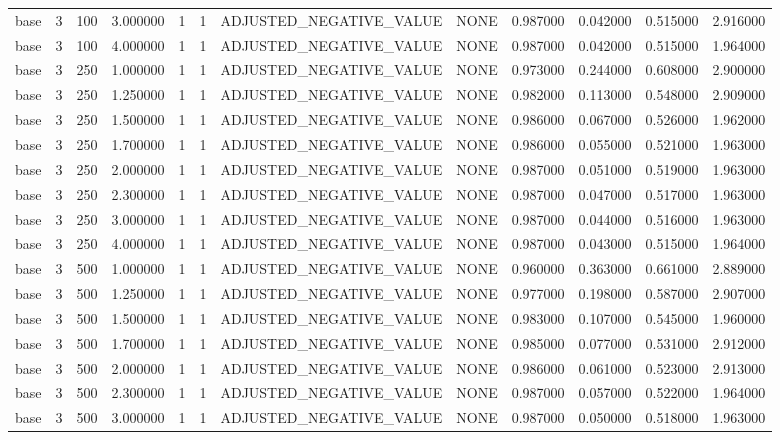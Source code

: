 \begin{tabular}{lrrrllllrrrr}
base & 3 & 100 & 3.000000 & 1 & 1 & ADJUSTED_NEGATIVE_VALUE & NONE & 0.987000 & 0.042000 & 0.515000 & 2.916000 \\
base & 3 & 100 & 4.000000 & 1 & 1 & ADJUSTED_NEGATIVE_VALUE & NONE & 0.987000 & 0.042000 & 0.515000 & 1.964000 \\
base & 3 & 250 & 1.000000 & 1 & 1 & ADJUSTED_NEGATIVE_VALUE & NONE & 0.973000 & 0.244000 & 0.608000 & 2.900000 \\
base & 3 & 250 & 1.250000 & 1 & 1 & ADJUSTED_NEGATIVE_VALUE & NONE & 0.982000 & 0.113000 & 0.548000 & 2.909000 \\
base & 3 & 250 & 1.500000 & 1 & 1 & ADJUSTED_NEGATIVE_VALUE & NONE & 0.986000 & 0.067000 & 0.526000 & 1.962000 \\
base & 3 & 250 & 1.700000 & 1 & 1 & ADJUSTED_NEGATIVE_VALUE & NONE & 0.986000 & 0.055000 & 0.521000 & 1.963000 \\
base & 3 & 250 & 2.000000 & 1 & 1 & ADJUSTED_NEGATIVE_VALUE & NONE & 0.987000 & 0.051000 & 0.519000 & 1.963000 \\
base & 3 & 250 & 2.300000 & 1 & 1 & ADJUSTED_NEGATIVE_VALUE & NONE & 0.987000 & 0.047000 & 0.517000 & 1.963000 \\
base & 3 & 250 & 3.000000 & 1 & 1 & ADJUSTED_NEGATIVE_VALUE & NONE & 0.987000 & 0.044000 & 0.516000 & 1.963000 \\
base & 3 & 250 & 4.000000 & 1 & 1 & ADJUSTED_NEGATIVE_VALUE & NONE & 0.987000 & 0.043000 & 0.515000 & 1.964000 \\
base & 3 & 500 & 1.000000 & 1 & 1 & ADJUSTED_NEGATIVE_VALUE & NONE & 0.960000 & 0.363000 & 0.661000 & 2.889000 \\
base & 3 & 500 & 1.250000 & 1 & 1 & ADJUSTED_NEGATIVE_VALUE & NONE & 0.977000 & 0.198000 & 0.587000 & 2.907000 \\
base & 3 & 500 & 1.500000 & 1 & 1 & ADJUSTED_NEGATIVE_VALUE & NONE & 0.983000 & 0.107000 & 0.545000 & 1.960000 \\
base & 3 & 500 & 1.700000 & 1 & 1 & ADJUSTED_NEGATIVE_VALUE & NONE & 0.985000 & 0.077000 & 0.531000 & 2.912000 \\
base & 3 & 500 & 2.000000 & 1 & 1 & ADJUSTED_NEGATIVE_VALUE & NONE & 0.986000 & 0.061000 & 0.523000 & 2.913000 \\
base & 3 & 500 & 2.300000 & 1 & 1 & ADJUSTED_NEGATIVE_VALUE & NONE & 0.987000 & 0.057000 & 0.522000 & 1.964000 \\
base & 3 & 500 & 3.000000 & 1 & 1 & ADJUSTED_NEGATIVE_VALUE & NONE & 0.987000 & 0.050000 & 0.518000 & 1.963000 \\

\end{tabular}
